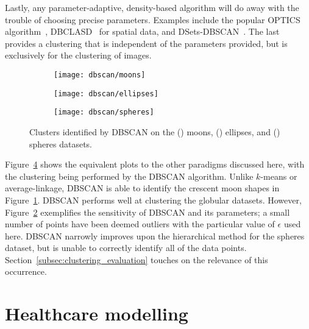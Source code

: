 Lastly, any parameter-adaptive, density-based algorithm will do away with the
trouble of choosing precise parameters. Examples include the popular OPTICS
algorithm~\cite{Ankerst1999}, DBCLASD~\cite{Xu1998} for spatial data, and
DSets-DBSCAN~\cite{Hou2016}. The last provides a clustering that is independent
of the parameters provided, but is exclusively for the clustering of images.

\begin{figure}
    \centering
    \begin{subfigure}{.333\textwidth}
        \texttt{[image: dbscan/moons]}
        \caption{}\label{fig:dbscan_moons}
    \end{subfigure}%
    \hfill%
    \begin{subfigure}{.333\textwidth}
        \texttt{[image: dbscan/ellipses]}
        \caption{}\label{fig:dbscan_ellipses}
    \end{subfigure}%
    \hfill%
    \begin{subfigure}{.333\textwidth}
        \texttt{[image: dbscan/spheres]}
        \caption{}\label{fig:dbscan_spheres}
    \end{subfigure}
    \caption{%
        Clusters identified by DBSCAN on the () moons,
        () ellipses, and
        () spheres datasets.%
    }\label{fig:dbscan_examples}
\end{figure}

Figure~\ref{fig:dbscan_examples} shows the equivalent plots to the other
paradigms discussed here, with the clustering being performed by the DBSCAN
algorithm. Unlike \(k\)-means or average-linkage, DBSCAN is able to identify the
crescent moon shapes in Figure~\ref{fig:dbscan_moons}. DBSCAN performs well at
clustering the globular datasets. However, Figure~\ref{fig:dbscan_ellipses}
exemplifies the sensitivity of DBSCAN and its parameters; a small number of
points have been deemed outliers with the particular value of \(\epsilon\) used
here. DBSCAN narrowly improves upon the hierarchical method for the spheres
dataset, but is unable to correctly identify all of the data points.
Section~\ref{subsec:clustering_evaluation} touches on the relevance of this
occurrence.

\section{Healthcare modelling}\label{sec:healthcare}

